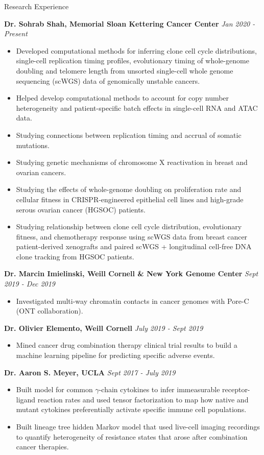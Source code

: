 \documentclass{resume} %
\begin{document}
\begin{rSection}{Research Experience}

{\bf Dr. Sohrab Shah, Memorial Sloan Kettering Cancer Center} \hfill {\em Jan 2020 - Present}
\begin{itemize}
  \item Developed computational methods for inferring clone cell cycle distributions, single-cell replication timing profiles, evolutionary timing of whole-genome doubling and telomere length from unsorted single-cell whole genome sequencing (scWGS) data of genomically unstable cancers.
  \item Helped develop computational methods to account for copy number heterogeneity and patient-specific batch effects in single-cell RNA and ATAC data.
  \item Studying connections between replication timing and accrual of somatic mutations.
  \item Studying genetic mechanisms of chromosome X reactivation in breast and ovarian cancers.
  \item Studying the effects of whole-genome doubling on proliferation rate and cellular fitness in CRISPR-engineered epithelial cell lines and high-grade serous ovarian cancer (HGSOC) patients.
  \item Studying relationship between clone cell cycle distribution, evolutionary fitness, and chemotherapy response using scWGS data from breast cancer patient-derived xenografts and paired scWGS + longitudinal cell-free DNA clone tracking from HGSOC patients.
\end{itemize}

{\bf Dr. Marcin Imielinski, Weill Cornell \& New York Genome Center} \hfill {\em Sept 2019 - Dec 2019}
\begin{itemize}
  \item Investigated multi-way chromatin contacts in cancer genomes with Pore-C (ONT collaboration).
\end{itemize}

{\bf Dr. Olivier Elemento, Weill Cornell} \hfill {\em July 2019 - Sept 2019}
\begin{itemize}
  \item Mined cancer drug combination therapy clinical trial results to build a machine learning pipeline for predicting specific adverse events.
\end{itemize}

{\bf Dr. Aaron S. Meyer, UCLA} \hfill {\em Sept 2017 - July 2019}
\begin{itemize}
  \item Built model for common $\gamma$-chain cytokines to infer immeasurable receptor-ligand reaction rates and used tensor factorization to map how native and mutant cytokines preferentially activate specific immune cell populations.
  \item Built lineage tree hidden Markov model that used live-cell imaging recordings to quantify heterogeneity of resistance states that arose after combination cancer therapies.
\end{itemize}


\end{rSection}
\end{document}
